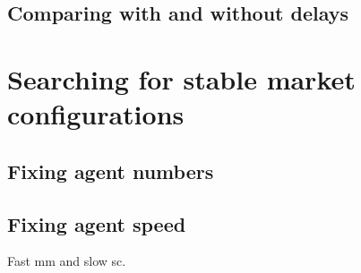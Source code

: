 \subsection{Comparing with and without delays}


\section{Searching for stable market configurations}

\subsection{Fixing agent numbers} %
\label{sub:fixing_agent_numbers}


\subsection{Fixing agent speed} %
\label{sub:fixing_agent_speed}
Fast mm and slow sc.
